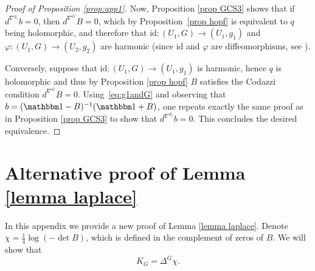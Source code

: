 \documentclass[JEP,XML,SOM,Unicode,NoEqCountersInSection,published]{cedram}
\theoremstyle{definition}
\begin{document}
\begin{proof}[Proof of Proposition \ref{prop:app1}]
Now, Proposition \ref{prop GCS3} shows that if $d^{\nabla^{g_1}}\!b=0$, then $d^{\nabla^{G}}\!B=0$, which by Proposition~\ref{prop hopf} is equivalent to $q$ being holomorphic, and therefore that \hbox{$\mathrm{id}:(U_1,G)\!\to\! (U_1,g_1)$} and $\varphi:(U_1,G)\to (U_2,g_2)$ are harmonic (since $\mathrm{id}$ and $\varphi$ are diffeomorphisms, see \cite[\S 9]{zbMATH03608406}).

Conversely, suppose that $\mathrm{id}:(U_1,G)\to (U_1,g_1)$ is harmonic, hence $q$ is holomorphic and thus by Proposition \ref{prop hopf} $B$ satisfies the Codazzi condition $d^{\nabla^{G}}\!B=0$. Using~\eqref{eq:g1andG} and observing that $b=(\mathbbm 1-B)^{-1}(\mathbbm 1+B)$, one repeats exactly the same proof as in Proposition \ref{prop GCS3} to show that $d^{\nabla^{g_1}}\!b=0$. This concludes the desired equivalence.
\end{proof}

\section{Alternative proof of Lemma \ref{lemma laplace}}
\label{app:alternative}

In this appendix we provide a new proof of Lemma \ref{lemma laplace}. Denote $\chi=\tfrac14\log(-\det B)$, which is defined in the complement of zeros of $B$. We will show that
\begin{equation}\label{eq:curvature laplacian}
K_G=\Delta^G\chi.
\end{equation}
\end{document}
